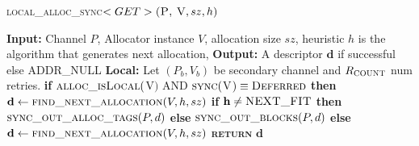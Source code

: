 \documentclass[10pt]{article}
\begin{document}
\begin{algorithm}{}
\footnotesize
\caption{\textsc{local\_alloc\_sync}{$<GET>\textsc{(P, V}, sz, h)$}}
\label{alg:lalloc_get} 
\begin{algorithmic}[1]


\STATE \textbf{Input:} Channel $P$, Allocator instance $V$, allocation size $sz$, heuristic $h$
is the algorithm that generates next allocation, 
\STATE \textbf{Output:} A descriptor {$\textbf{d}$} if successful else \textsc{ADDR\_NULL}
\STATE \textbf{Local:} Let $(P_{b}, V_{b})$ be secondary channel and $R_{\textsc{COUNT}}$ num retries.
\STATE \textbf{if} $\textsc{alloc\_isLocal}($V$)$ AND $\textsc{sync}($V$) \equiv \textsc{Deferred}$ \textbf{then} 
\STATE \quad $\textbf{d} \leftarrow  \textsc{find\_next\_allocation}(V, h, sz)$ 
\STATE \quad \textbf{if}  $\textbf{h} \neq \textsc{NEXT\_FIT}$ \textbf{then}
\STATE \qquad $\textsc{sync\_out\_alloc\_tags}(P, d)$
\STATE \quad \textbf{else}
\STATE \qquad $\textsc{sync\_out\_blocks}(P, d)$
\STATE \textbf{else}
\STATE \quad $\textbf{d} \leftarrow  \textsc{find\_next\_allocation}(V, h, sz)$ 
\STATE \textsc{\textbf{return}} {$\textbf{d}$}
\STATE


\end{algorithmic}
\end{algorithm}
\end{document}

